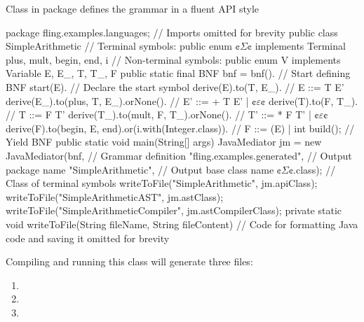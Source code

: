 \documentclass[a4paper,UKenglish,cleveref, autoref]{darts-v2019}
\begin{document}
\begin{content}
Class  in  package  defines the grammar 
in a fluent API style
\begin{excerpt*}[language=java]
package fling.examples.languages;
// Imports omitted for brevity
public class SimpleArithmetic {
  // Terminal symbols:
  public enum ¢$Σ$¢ implements Terminal {plus, mult, begin, end, i}
  // Non-terminal symbols:
  public enum V implements Variable {E, E_, T, T_, F}
  public static final BNF bnf = bnf(). // Start defining BNF
    start(E). // Declare the start symbol
    derive(E).to(T, E_). // E ::= T E'
    derive(E_).to(plus, T, E_).orNone(). // E' ::= + T E' | ¢$ε$¢
    derive(T).to(F, T_). // T ::= F T'
    derive(T_).to(mult, F, T_).orNone(). // T' ::= * F T' | ¢$ε$¢
    derive(F).to(begin, E, end).or(i.with(Integer.class)). // F ::= (E) | int
    build(); // Yield BNF
  public static void main(String[] args) {
    JavaMediator jm = new JavaMediator(bnf, // Grammar definition
      "fling.examples.generated", // Output package name
      "SimpleArithmetic", // Output base class name
      ¢$Σ$¢.class); // Class of terminal symbols
    writeToFile("SimpleArithmetic", jm.apiClass);
    writeToFile("SimpleArithmeticAST", jm.astClass);
    writeToFile("SimpleArithmeticCompiler", jm.astCompilerClass);
  }
  private static void writeToFile(String fileName, String fileContent) {
    // Code for formatting Java code and saving it omitted for brevity 
  }
}
\end{excerpt*}

Compiling and running this class will generate three files:
\begin{enumerate}
\item {}
\item {}
\item {}
\end{enumerate}


\end{content}
\end{document}
